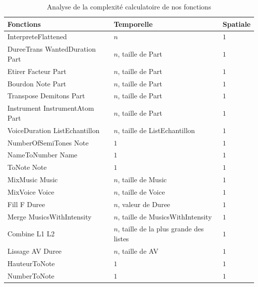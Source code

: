 \documentclass[10pt,a4paper]{article}
\begin{document}
	\begin{table}[ht!]
		\centering
			\begin{tabular}{|p{}|p{0.25\textwidth}|p{}|}
			\hline
			\textbf{Fonctions}																& \textbf{Temporelle}							& \textbf{Spatiale}	\\
			\hline
			InterpreteFlattened																& $n$ 														& $1$ \\
			\hline
			DureeTrans WantedDuration Part 										& $n$, taille de Part							& $1$ \\
			\hline 
			Etirer Facteur Part																& $n$, taille de Part 						& $1$ \\
			\hline
			Bourdon Note Part																	& $n$, taille de Part 						& $1$ \\
			\hline
			Transpose Demitons Part														& $n$, taille de Part 						& $1$ \\
			\hline
			Instrument InstrumentAtom Part										& $n$, taille de Part							& $1$ \\
			\hline
			VoiceDuration ListEchantillon											& $n$, taille de ListEchantillon	& $1$ \\
			\hline
			NumberOfSemiTones Note														& $1$ 														& $1$ \\
			\hline
			NameToNumber Name																	& $1$ 														& $1$ \\
			\hline
			ToNote Note																				& $1$ 														& $1$ \\ 
			\hline
			\hline
			MixMusic Music																		& $n$, taille de Music						& $1$ \\
			\hline
			MixVoice Voice																		& $n$, taille de Voice						& $1$ \\
			\hline
			Fill F Duree																			& $n$, valeur de Duree						& $1$ \\
			\hline
			Merge MusicsWithIntensity													& $n$, taille de MusicsWithIntensity	& $1$ \\
			\hline
			Combine L1 L2																			& $n$, taille de la plus grande des listes	& $1$ \\
			\hline
			Lissage AV Duree																	& $n$, taille de AV								& $1$ \\
			\hline
			HauteurToNote																			& $1$ 														& $1$ \\
			\hline
			NumberToNote																			& $1$ 														& $1$ \\
			\hline
			\end{tabular}
		\caption{Analyse de la complexité calculatoire de nos fonctions}
	\end{table}
\end{document}

